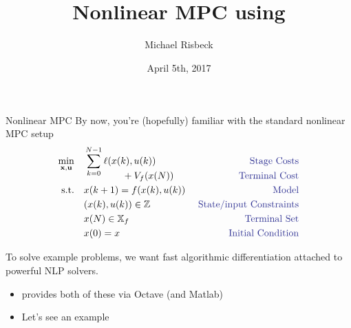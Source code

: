 \documentclass[xcolor=dvipsnames,handout]{beamer}
\title[MPCTools]{\Huge \mpctools{} \\ \LARGE Nonlinear MPC using \casadi{}}
\author[Michael Risbeck]{\LARGE Michael Risbeck}
\date[April 5th, 2017]{\Large April 5th, 2017}
\newcommand{\seq}{\mathbf}
\newcommand{\useq}{\seq{u}}
\newcommand{\xseq}{\seq{x}}
\newcommand{\bbX}{\mathbb{X}}
\newcommand{\bbZ}{\mathbb{Z}}
\begin{document}
\frame{\titlepage}

\begin{frame}[fragile]{Nonlinear MPC}
    \renewcommand{\emph}[1]{\text{\textcolor{Blue}{#1}}}
    By now, you're (hopefully) familiar with the standard nonlinear MPC setup
    \begin{align*}
        \min_{\xseq, \useq} \quad & \sum_{k = 0}^{N - 1} \ell(x(k),u(k)) & \emph{Stage Costs} \\[-1em]
        & \qquad\qquad + V_f(x(N)) & \emph{Terminal Cost} \\
        \text{s.t.} \quad & x(k + 1) = f(x(k), u(k))\ & \emph{Model}\\
        & (x(k), u(k)) \in \bbZ & \emph{State/input Constraints} \\
        & x(N) \in \bbX_f & \emph{Terminal Set} \\
        & x(0) = x & \emph{Initial Condition}
    \end{align*} \pause
    
    \vspace{-1em}
    
    To solve example problems, we want fast algorithmic differentiation attached to powerful NLP solvers.
    \begin{itemize}
        \item \casadi{} provides both of these via Octave (and Matlab)
        \item Let's see an example
    \end{itemize}
\end{frame}
\end{document}
